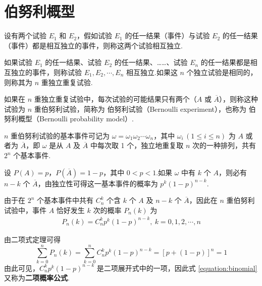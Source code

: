 \section{伯努利概型}

\begin{definition}
    \indent 设有两个试验 $E_1$ 和 $E_2$，假如试验 $E_1$ 的任一结果（事件）与试验 $E_2$ 的任一结果（事件）都是相互独立的事件，则称这两个试验相互独立.
\end{definition}

\begin{definition}
    \indent 如果试验 $E_1$ 的任一结果、试验 $E_2$ 的任一结果、……、试验 $E_n$ 的任一结果都是相互独立的事件，则称试验 $E_1, E_2, \cdots, E_n$ 相互独立.如果这 $n$ 个独立试验是相同的，则称其为 $n$ {\heiti 重独立重复试验}.
\end{definition}

\begin{definition}
    \indent 如果在 $n$ 重独立重复试验中，每次试验的可能结果只有两个（$A$ 或 $\overline{A}$），则称这种试验为 $n$ {\heiti 重伯努利试验}，简称为 {\heiti 伯努利试验}（Bernoulli experiment），也称为 {\heiti 伯努利概型}（Bernoulli probability model）.
\end{definition}

$n$ 重伯努利试验的基本事件可记为 $\omega=\omega_1 \omega_2 \cdots \omega_n$，其中 $\omega_i\,(1\leqslant i\leqslant n)$ 为 $A$ 或者为 $\overline{A}$，即 $\omega$ 是从 $A$ 及 $\overline{A}$ 中每次取 1 个，独立地重复取 $n$ 次的一种排列，共有 $2^n$ 个基本事件.

设 $P(A)=p$，$P(\overline{A}) = 1-p$，其中 $0<p<1$.如果 $\omega$ 中有 $k$ 个 $A$，则必有 $n-k$ 个 $\overline{A}$，由独立性可得这一基本事件的概率为 $p^k (1-p)^{n-k}$.

由于在 $2^n$ 个基本事件中共有 $C_n^k$ 个含 $k$ 个 $A$ 及 $n-k$ 个 $\overline{A}$，因此在 $n$ 重伯努利试验中，事件 $A$ 恰好发生 $k$ 次的概率 $P_n(k)$ 为
\begin{gather} \label{equation:binomial}
    P_n(k)=C_n^k p^k (1-p)^{n-k}, \ k=0,1,2,\cdots,n
\end{gather}

由二项式定理可得
$$
\sum_{k=0}^n P_n(k) = \sum_{k=0}^n C_n^k p^k (1-p)^{n-k} = [p+(1-p)]^n = 1
$$
由此可见，$C_n^k p^k (1-p)^{n-k}$ 是二项展开式中的一项，因此式 \eqref{equation:binomial} 又称为\textbf{二项概率公式}.